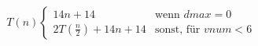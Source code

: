 \begin{align}
\label{eq:analyse-getvertex-all-1}
T(n)
\begin{cases}
	14n + 14 & \mbox{wenn } \mathit{dmax} = 0 \\
	2T(\frac{n}{2}) + 14n + 14 & \mbox{sonst, für } \mathit{vnum} < 6
\end{cases}
\end{align}
